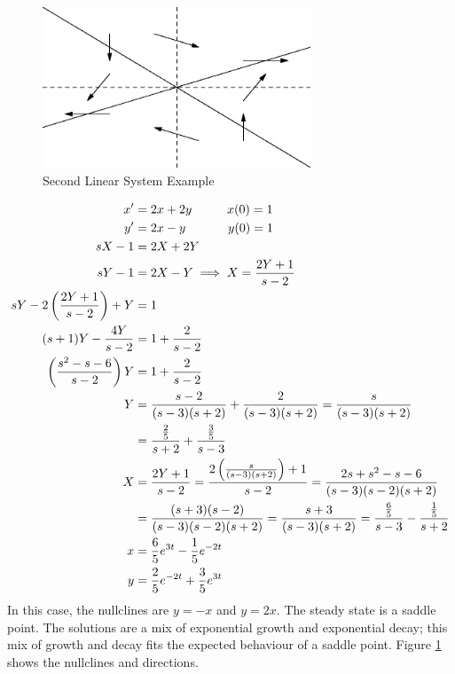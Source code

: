 \documentclass[fleqn,letterpaper]{report}
\begin{document}
\begin{figure}[t]
\centering
\includegraphics[width=8cm]{figure35.eps}
\caption{Second Linear System Example}
\label{figure-linear-system2}
\end{figure}

\begin{example}
\begin{align*}
x^\prime & = 2x + 2y \hspace{1cm} x(0) = 1 \\
y^\prime & = 2x - y \hspace{1.2cm} y(0) = 1 \\
sX - 1 & = 2X + 2Y \\
sY - 1 & = 2X - Y \implies X = \frac{2Y+1}{s-2} \\
sY - 2 \left( \frac{2Y+1}{s-2} \right) + Y & = 1 \\
(s+1) Y - \frac{4Y}{s-2} & = 1 + \frac{2}{s-2} \\
\left( \frac{s^2-s-6}{s-2} \right) Y & = 1 + \frac{2}{s-2} \\
Y & = \frac{s-2}{(s-3)(s+2)} + \frac{2}{(s-3)(s+2)} =
\frac{s}{(s-3)(s+2)} \\
& = \frac{\frac{2}{5}}{s+2} + \frac{\frac{3}{5}}{s-3} \\
X & = \frac{2Y+1}{s-2} = \frac{2\left( \frac{s}{(s-3)(s+2)}
\right) + 1}{s-2} = \frac{2s + s^2 - s - 6}{(s-3)(s-2)(s+2)} \\
& = \frac{(s+3)(s-2)}{(s-3)(s-2)(s+2)} 
= \frac{s+3}{(s-3)(s+2)} = \frac{\frac{6}{5}}{s-3} -
\frac{\frac{1}{5}}{s+2} \\
x & = \frac{6}{5} e^{3t} - \frac{1}{5} e^{-2t} \\
y & = \frac{2}{5} e^{-2t} + \frac{3}{5} e^{3t} 
\end{align*}
In this case, the nullclines are $y = -x$ and $y = 2x$. 
The steady state is a saddle point. The solutions are 
a mix of exponential growth and exponential decay; this mix of
growth and decay fits the expected behaviour of a saddle point.
Figure \ref{figure-linear-system2} shows the nullclines
and directions. 
\end{example}
\end{document}
